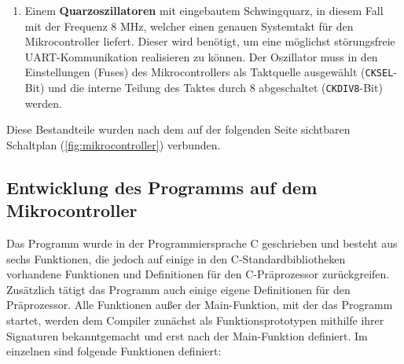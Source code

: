 \begin{enumerate}
\item Einem \textbf{Quarzoszillatoren} mit eingebautem Schwingquarz, in diesem Fall mit der Frequenz 8 MHz, welcher einen genauen Systemtakt für den Mikrocontroller liefert. Dieser wird benötigt, um eine möglichst störungsfreie UART-Kommunikation realisieren zu können. Der Oszillator muss in den Einstellungen (Fuses) des Mikrocontrollers als Taktquelle ausgewählt (\texttt{CKSEL}-Bit) und die interne Teilung des Taktes durch 8 abgeschaltet (\texttt{CKDIV8}-Bit) werden.
\end{enumerate}
Diese Bestandteile wurden nach dem auf der folgenden Seite sichtbaren Schaltplan (\autoref{fig:mikrocontroller}) verbunden.
\subsection{Entwicklung des Programms auf dem Mikrocontroller}
Das Programm wurde in der Programmiersprache C geschrieben und besteht aus sechs Funktionen, die jedoch auf einige in den C-Standardbibliotheken vorhandene Funktionen und Definitionen für den C-Präprozessor zurückgreifen. Zusätzlich tätigt das Programm auch einige eigene Definitionen für den Präprozessor. Alle Funktionen außer der Main-Funktion, mit der das Programm startet, werden dem Compiler zunächst als Funktionsprototypen mithilfe ihrer Signaturen bekanntgemacht und erst nach der Main-Funktion definiert. Im einzelnen sind folgende Funktionen definiert:
